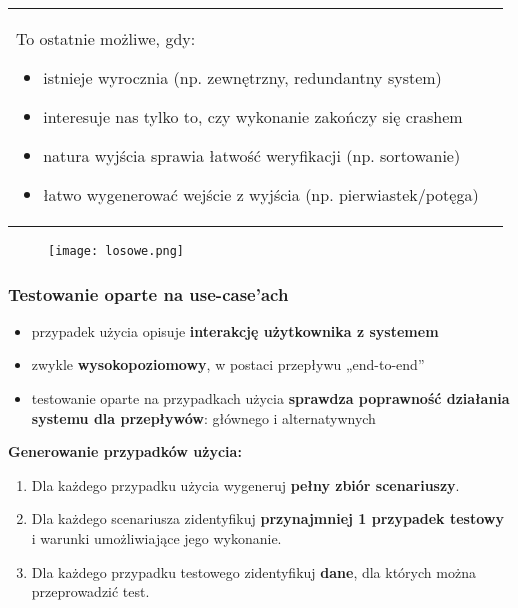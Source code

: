 \documentclass[../main.tex]{subfiles}
\begin{document}
\begin{table}[H]
\begin{center}
\begin{tabular}{ p{8cm} | p{8cm}}
                To ostatnie możliwe, gdy:
                \begin{itemize}
                    \item istnieje wyrocznia (np. zewnętrzny, redundantny system)
                    \item interesuje nas tylko to, czy wykonanie zakończy się crashem
                    \item natura wyjścia sprawia łatwość weryfikacji (np. sortowanie)
                    \item łatwo wygenerować wejście z wyjścia (np. pierwiastek/potęga)
                \end{itemize} \\
            \end{tabular}
        \end{center}
    \end{table}



    \begin{figure}[H]
        \texttt{[image: losowe.png]}
    \end{figure}

    \subsubsection{Testowanie oparte na use-case'ach}
    \begin{itemize}
        \item przypadek użycia opisuje \textbf{interakcję użytkownika z systemem}
        \item zwykle \textbf{wysokopoziomowy}, w postaci przepływu „end-to-end”
        \item testowanie oparte na przypadkach użycia \textbf{sprawdza poprawność
        działania systemu dla przepływów}: głównego i alternatywnych
    \end{itemize}

    \textbf{Generowanie przypadków użycia:}
    \begin{enumerate}
        \item Dla każdego przypadku użycia wygeneruj \textbf{pełny zbiór scenariuszy}.
        \item Dla każdego scenariusza zidentyfikuj \textbf{przynajmniej 1 przypadek testowy} i warunki
        umożliwiające jego wykonanie.
        \item Dla każdego przypadku testowego zidentyfikuj \textbf{dane}, dla których można przeprowadzić test.
    \end{enumerate}
\end{document}
